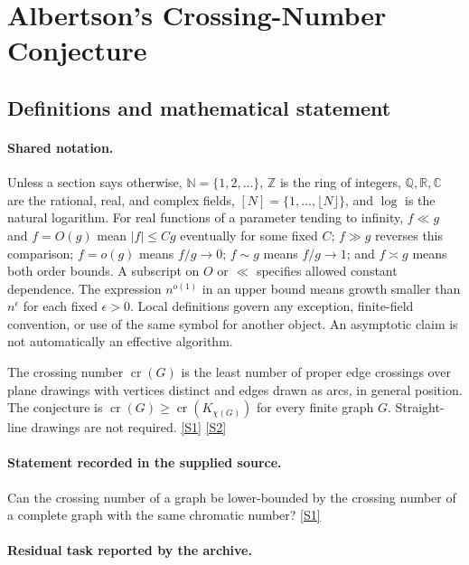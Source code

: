 \documentclass[11pt,a4paper]{article}
\newcommand{\N}{\mathbb{N}}
\newcommand{\Z}{\mathbb{Z}}
\newcommand{\Q}{\mathbb{Q}}
\newcommand{\R}{\mathbb{R}}
\newcommand{\C}{\mathbb{C}}
\newcommand{\sref}[2]{\hyperlink{source:#1:#2}{[S#2]}}
\begin{document}
\section{Albertson’s Crossing-Number Conjecture}\label{statement}


\subsection{Definitions and mathematical statement}

\paragraph{Shared notation.}Unless a section says otherwise, $\N=\{1,2,\ldots\}$,
$\Z$ is the ring of integers, $\Q,\R,\C$ are the rational, real, and complex
fields, $[N]=\{1,\ldots,\lfloor N\rfloor\}$, and $\log$ is the natural
logarithm. For real functions of a parameter tending to infinity,
$f\ll g$ and $f=O(g)$ mean $|f|\leq Cg$ eventually for some fixed $C$;
$f\gg g$ reverses this comparison; $f=o(g)$ means $f/g\to0$;
$f\sim g$ means $f/g\to1$; and $f\asymp g$ means both order bounds.
A subscript on $O$ or $\ll$ specifies allowed constant dependence.
The expression $n^{o(1)}$ in an upper bound means growth smaller than
$n^\epsilon$ for each fixed $\epsilon>0$. Local definitions govern any
exception, finite-field convention, or use of the same symbol for another
object. An asymptotic claim is not automatically an effective algorithm.



The crossing number $\operatorname{cr}(G)$ is the least number of proper edge crossings over plane drawings with vertices distinct and edges drawn as arcs, in general position. The conjecture is $\operatorname{cr}(G)\geq\operatorname{cr}(K_{\chi(G)})$ for every finite graph $G$. Straight-line drawings are not required. \sref{statement}{1} \sref{statement}{2}

\paragraph{Statement recorded in the supplied source.}
Can the crossing number of a graph be lower-bounded by the crossing number of a complete graph with the same chromatic number? \sref{statement}{1}

\paragraph{Residual task reported by the archive.}
\end{document}
